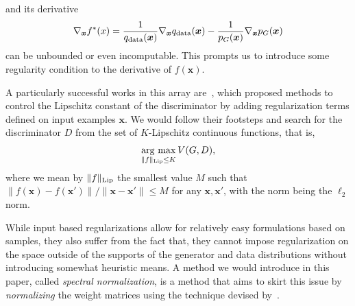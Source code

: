\documentclass{article}
\newcommand{\argmax}{\mathop{\rm arg~max}\limits}
\newcommand\mnote[1]{}
\newcommand\ynote[1]{}
\newcommand\knote[1]{}
\newcommand\mnote[1]{\textcolor{blue}{(MIYATO: #1)}}
\newcommand\ynote[1]{\textcolor{blue}{(Yoshida: #1)}}
\newcommand\knote[1]{\textcolor{blue}{(Kataoka: #1)}}
\newcommand{\bmx}{{\bm x}}
\newcommand{\bmh}{{\bm h}}
\begin{document}
and its derivative
\begin{align}
\nabla_\bmx f^*(x) = \frac{1}{q_{\rm data}(\bmx)}\nabla_{\bmx}q_{\rm data}(\bmx) - \frac{1}{p_G(\bmx)}\nabla_{\bmx}p_G(\bmx)
\end{align}
can be unbounded or even incomputable.
This prompts us to introduce some regularity condition to the derivative of $f(\bmx)$.

A particularly successful works in this array are~\cite[]{qi2017loss, arjovsky2017wasserstein, gulrajani2017improved}, which proposed methods to control the Lipschitz constant of the  discriminator by adding regularization terms defined on input examples $\bmx$.
We would follow their footsteps and search for the discriminator $D$ from the set of $K$-Lipschitz continuous functions, that is,
\begin{align}
	\argmax_{\|f\|_{\rm Lip}\leq K} V(G, D), \label{eq:lipschitz}
\end{align}
where we mean by $\|f\|_{\rm Lip}$ the smallest value $M$ such that $\|f(\bmx)-f(\bmx')\| / \|\bmx-\bmx'\|\leq M$ for any $\bmx,\bmx'$, with the norm being the $\ell_2$ norm.
%
%

While input based regularizations allow for relatively easy formulations based on samples, they also suffer from the fact that, they cannot impose regularization on the space outside of the supports of the generator and data distributions without introducing somewhat heuristic means.
A method we would introduce in this paper, called \textit{spectral normalization}, is a method that aims to skirt this issue by \textit{normalizing} the weight matrices using the technique devised by~\cite{yoshida2017spectral}.
\end{document}
